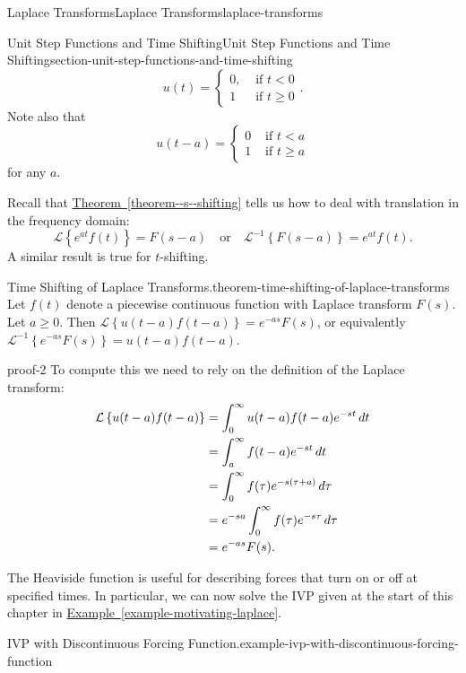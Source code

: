 \documentclass[oneside,10pt,]{book}
\renewcommand{\qedhere}{\relax}
\numberwithin{equation}{section}
\newcommand{\Laplace}[1]{\mathcal{L}\left\{#1\right\}}
\newcommand{\iLaplace}[1]{\mathcal{L}^{-1}\left\{#1\right\}}
\newcommand{\lt}{<}
\newcommand{\amp}{&}
\begin{document}
\begin{chapterptx}{Laplace Transforms}{}{Laplace Transforms}{}{}{laplace-transforms}
\begin{sectionptx}{Unit Step Functions and Time Shifting}{}{Unit Step Functions and Time Shifting}{}{}{section-unit-step-functions-and-time-shifting}
\begin{equation*}
u(t) = \begin{cases}
0, \amp\text{ if }t\lt 0\\
1 \amp\text{ if } t\geq0
\end{cases}.
\end{equation*}
Note also that%
\begin{equation*}
u(t-a) = \begin{cases}
0 \amp\text{ if }t\lt a\\
1 \amp\text{ if } t\geq a
\end{cases}
\end{equation*}
for any \(a\).%
\par
\hypertarget{p-522}{}%
Recall that \hyperref[theorem--s--shifting]{Theorem~\ref{theorem--s--shifting}} tells us how to deal with translation in the frequency domain:%
\begin{equation*}
\Laplace{e^{at}f(t)} = F(s-a) \quad\text{or}\quad\iLaplace{F(s-a)} = e^{at}f(t).
\end{equation*}
A similar result is true for \(t\)-shifting.%
\begin{theorem}{Time Shifting of Laplace Transforms.}{}{theorem-time-shifting-of-laplace-transforms}%
\hypertarget{p-523}{}%
Let \(f(t)\) denote a piecewise continuous function with Laplace transform \(F(s)\). Let \(a\geq0\). Then \(\Laplace{u(t-a)f(t-a)} = e^{-as}F(s)\), or equivalently \(\iLaplace{e^{-as}F(s)} = u(t-a)f(t-a)\).%
\end{theorem}
\begin{proofptx}{}{proof-2}
\hypertarget{p-524}{}%
To compute this we need to rely on the definition of the Laplace transform:%
\begin{align*}
\Laplace{u(t-a)f(t-a)} \amp= \int_{0}^{\infty}u(t-a)f(t-a)e^{-st}\,dt\\
\amp= \int_{a}^{\infty}f(t-a)e^{-st}\,dt\\
\amp= \int_{0}^{\infty}f(\tau)e^{-s(\tau+a)}\,d\tau\\
\amp= e^{-sa}\int_{0}^{\infty}f(\tau)e^{-s\tau}\,d\tau\\
\amp= e^{-as}F(s)\text{.}\qedhere
\end{align*}
%
\end{proofptx}
\hypertarget{p-525}{}%
The Heaviside function is useful for describing forces that turn on or off at specified times. In particular, we can now solve the IVP given at the start of this chapter in \hyperref[example-motivating-laplace]{Example~\ref{example-motivating-laplace}}.%
\begin{example}{IVP with Discontinuous Forcing Function.}{example-ivp-with-discontinuous-forcing-function}%

\end{example}
\end{sectionptx}
\end{chapterptx}
\end{document}
